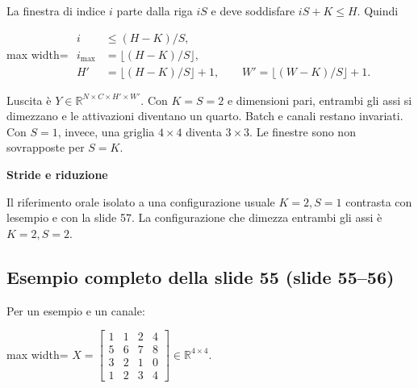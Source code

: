 \documentclass[11pt,a4paper,oneside,openany]{book}
\renewenvironment{quote}{\list{}{\leftmargin=1em\rightmargin=0pt}\item\relax}{\endlist}
\begin{document}
La finestra di indice \(i\) parte dalla riga \(iS\) e deve soddisfare \(iS+K\leq H\). Quindi

\begin{center}
\begin{adjustbox}{max width=\linewidth}
$\displaystyle 
\begin{aligned}
i&\leq(H-K)/S,\\
i_{\max}&=\lfloor(H-K)/S\rfloor,\\
\boxed{H'}&=\boxed{\lfloor(H-K)/S\rfloor+1},\qquad
\boxed{W'}=\boxed{\lfloor(W-K)/S\rfloor+1}.
\end{aligned}
$
\end{adjustbox}
\end{center}

L\textquotesingle uscita è \(Y\in\mathbb{R}^{N\times C\times H'\times W'}\). Con \(K=S=2\) e dimensioni pari, entrambi gli assi si dimezzano e le attivazioni diventano un quarto. Batch e canali restano invariati. Con \(S=1\), invece, una griglia \(4\times4\) diventa \(3\times3\). Le finestre sono non sovrapposte per \(S=K\).

\begin{quote}
\textbf{Stride e riduzione}
\end{quote}

\begin{quote}
Il riferimento orale isolato a una configurazione usuale \(K=2,S=1\) contrasta con l\textquotesingle esempio e con la slide 57. La configurazione che dimezza entrambi gli assi è \(K=2,S=2\).
\end{quote}

\subsection{Esempio completo della slide 55 (slide 55--56)}\label{f02-r839}

Per un esempio e un canale:

\begin{center}
\begin{adjustbox}{max width=\linewidth}
$\displaystyle 
X=\begin{bmatrix}1&1&2&4\\5&6&7&8\\3&2&1&0\\1&2&3&4\end{bmatrix}\in\mathbb{R}^{4\times4}.
$
\end{adjustbox}
\end{center}
\end{document}
